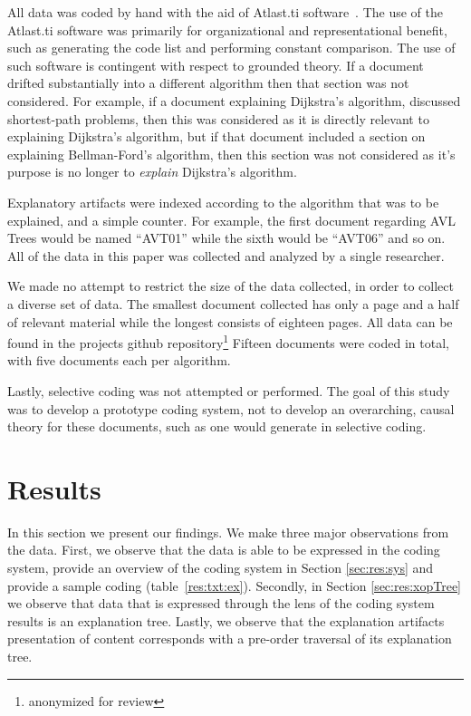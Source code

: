 \documentclass[sigconf]{acmart}
\begin{document}
All data was coded by hand with the aid of Atlast.ti software~\cite{atlast}.
The use of the Atlast.ti software was primarily for organizational and
representational benefit, such as generating the code list and performing
constant comparison.
%
The use of such software is contingent with respect to grounded theory.
%
If a document drifted substantially into a different algorithm then that section
was not considered. For example, if a document explaining Dijkstra's algorithm,
discussed shortest-path problems, then this was considered as it is directly
relevant to explaining Dijkstra's algorithm, but if that document included a
section on explaining Bellman-Ford's algorithm, then this section was not
considered as it's purpose is no longer to \emph{explain} Dijkstra's algorithm.

Explanatory artifacts were indexed according to the algorithm that was to be
explained, and a simple counter. For example, the first document regarding AVL
Trees would be named ``AVT01'' while the sixth would be ``AVT06'' and so on.
All of the data in this paper was collected and analyzed by a single researcher.

We made no attempt to restrict the size of the data collected, in order to
collect a diverse set of data. The smallest document collected has only a page
and a half of relevant material while the longest consists of eighteen pages.
All data can be found in the projects github repository\footnote[1]{anonymized for
  review} Fifteen documents were coded in total, with five documents each per
algorithm.

Lastly, selective coding was not attempted or performed. The goal of this study
was to develop a prototype coding system, not to develop an overarching, causal
theory for these documents, such as one would generate in selective coding.

\section{Results}
In this section we present our findings. We make three major observations from
the data. First, we observe that the data is able to be expressed in the coding
system, provide an overview of the coding system in Section \ref{sec:res:sys}
and provide a sample coding (table~\ref{res:txt:ex}). Secondly, in Section
\ref{sec:res:xopTree} we observe that data that is expressed through the lens of
the coding system results is an explanation tree. Lastly, we observe that the
explanation artifacts presentation of content corresponds with a pre-order
traversal of its explanation tree.
\end{document}
